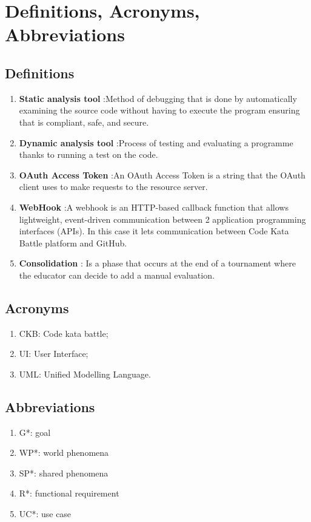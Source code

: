 \section{Definitions, Acronyms, Abbreviations}
\subsection{Definitions}
\begin{enumerate} [label=\textbullet]
    \item \textbf{Static analysis tool} :Method of debugging that is done by automatically examining the source code without having to execute the program ensuring that is  compliant, safe, and secure.
    \item \textbf{Dynamic analysis tool} :Process of testing and evaluating a programme thanks to running a test on the code.
    \item \textbf{OAuth Access Token} :An OAuth Access Token is a string that the OAuth client uses to make requests to the resource server.
    \item \textbf{WebHook} :A webhook is an HTTP-based callback function that allows lightweight, event-driven communication between 2 application programming interfaces (APIs). In this case it lets communication between Code Kata Battle platform and GitHub.
    \item \textbf{Consolidation} : Is a phase that occurs at the end of a tournament where the educator can decide to add a manual evaluation.
\end{enumerate}
\subsection{Acronyms}
    \begin{enumerate}[label=\textbullet]
        \item CKB: Code kata battle;
        \item UI: User Interface;
        \item UML: Unified Modelling Language.
    \end{enumerate}

\subsection{Abbreviations}
\begin{enumerate}[label=\textbullet]
    \item G*: goal
    \item WP*: world phenomena
    \item SP*: shared phenomena
    \item R*: functional requirement
    \item UC*: use case
\end{enumerate}
    
